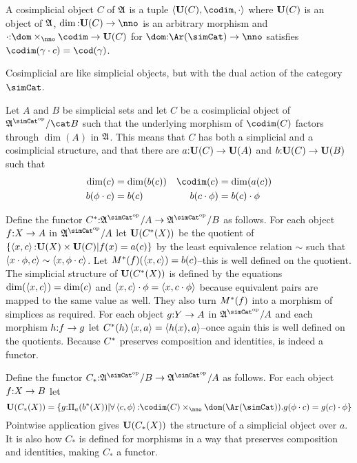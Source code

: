 \documentclass[csh.tex]{subfiles}
\begin{document}
\begin{definition} A cosimplicial object $C$ of $\mathfrak A$ is a tuple $\tuplet{\base(C),\codim,\cdot}$ where $\mathbf{U}(C)$ is an object of $\mathfrak A$, $\dim\of\base(C)\to\nno$ is an arbitrary morphism and $\cdot\of \dom\times_{\nno}\codim \to \base (C)$ for $\dom\of \Ar(\simCat)\to\nno$
 satisfies $\codim(\gamma\cdot c) = \cod(\gamma)$.
\end{definition}

Cosimplicial are like simplicial objects, but with the dual action of the category $\simCat$.

\begin{definition} Let $A$ and $B$ be simplicial sets and let $C$ be a cosimplicial object of $\ambient\s/\cat B$ such that the underlying morphism of $\codim(C)$ factors through $\dim(A)$ in $\mathfrak A$. This means that $C$ has both a simplicial and a cosimplicial structure, and that
there are $a\mathord :\mathbf{U}(C)\to\mathbf{U}(A)$ and $b\mathord :\mathbf{U}(C)\to\mathbf{U}(B)$ such that 
\begin{align*}
\dim(c) &= \dim(b(c)) & \codim(c) &= \dim(a(c))\\b(\phi\cdot c) &= b(c) & b(c\cdot\phi)&=b(c)\cdot\phi\\
\end{align*}

Define the functor $C\ri\of\ambient\s/A\to \ambient\s/B$ as follows. For each object $f\mathord : X\to A$ in $\ambient \s/A$ let $\mathbf{U}(C^*(X))$ be the quotient of $\left\{\left\langle x,c \right\rangle\mathord : \mathbf{U}(X)\times \mathbf{U}(C)| f(x)=a(c) \right\}$ by the least equivalence relation $\sim$ such that $\left\langle x\cdot\phi,c \right\rangle\sim\left\langle x,\phi\cdot c \right\rangle$. Let $M^*(f)(\left\langle x,c \right\rangle) = b(c)$--this is well defined on the quotient. 
The simplicial structure of $\mathbf{U}(C^*(X))$ is defined by the equations $\dim(\left\langle x,c \right\rangle) = \dim(c)$ and $\left\langle x,c \right\rangle\cdot \phi = \left\langle x,c\cdot\phi \right\rangle$ because equivalent pairs are mapped to the same value as well. They also turn $M^*(f)$ into a morphism of simplices as required. For each object $g\mathord : Y\to A$ in $\ambient \s/A$ and each morphism $h\mathord : f\to g$ let $C^*(h)\left\langle x,a \right\rangle = \left\langle h(x),a \right\rangle$--once again this is well defined on the quotients. Because $C^*$ preserves composition and identities, is indeed a functor.

Define the functor $C_*\of\ambient\s/B\to \ambient\s/A$ as follows. For each object $f\mathord : X\to B$ let 
\[ \base(C_*(X)) = \set{g\of \dprod a(b\ri(X)) | \forall \tuplet{c,\phi}\of\codim(C)\times_\nno\dom(\Ar(\simCat)).g(\phi\cdot c)= g(c)\cdot \phi }\]
Pointwise application gives $\mathbf{U}(C_*(X))$ the structure of a simplicial object over $a$. It is also how $C_*$ is defined for morphisms in a way that preserves composition and identities, making $C_*$ a functor.


\end{definition}
\end{document}
